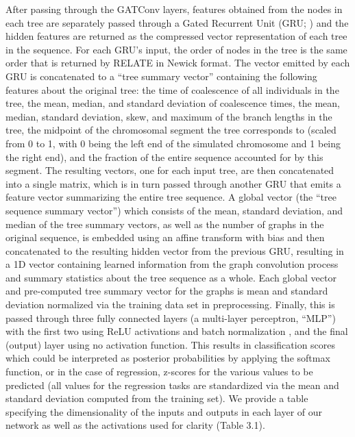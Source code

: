 After passing through the GATConv layers, features obtained from the nodes in each tree are separately passed through a Gated Recurrent Unit (GRU; \cite{choLearningPhraseRepresentations2014}) and the hidden features are returned as the compressed vector representation of each tree in the sequence. For each GRU's input, the order of nodes in the tree is the same order that is returned by RELATE in Newick format. The vector emitted by each GRU is concatenated to a “tree summary vector” containing the following features about the original tree: the time of coalescence of all individuals in the tree, the mean, median, and standard deviation of coalescence times, the mean, median, standard deviation, skew, and maximum of the branch lengths in the tree, the midpoint of the chromosomal segment the tree corresponds to (scaled from 0 to 1, with 0 being the left end of the simulated chromosome and 1 being the right end), and the fraction of the entire sequence accounted for by this segment. The resulting vectors, one for each input tree, are then concatenated into a single matrix, which is in turn passed through another GRU that emits a feature vector summarizing the entire tree sequence. A global vector (the “tree sequence summary vector”) which consists of the mean, standard deviation, and median of the tree summary vectors, as well as the number of graphs in the original sequence, is embedded using an affine transform with bias and then concatenated to the resulting hidden vector from the previous GRU, resulting in a 1D vector containing learned information from the graph convolution process and summary statistics about the tree sequence as a whole. Each global vector and pre-computed tree summary vector for the graphs is mean and standard deviation normalized via the training data set in preprocessing. Finally, this is passed through three fully connected layers (a multi-layer perceptron, “MLP”) with the first two using ReLU activations and batch normalization \cite{ioffeBatchNormalizationAccelerating2015}, and the final (output) layer using no activation function. This results in classification scores which could be interpreted as posterior probabilities by applying the softmax function, or in the case of regression, z-scores for the various values to be predicted (all values for the regression tasks are standardized via the mean and standard deviation computed from the training set). We provide a table specifying the dimensionality of the inputs and outputs in each layer of our network as well as the activations used for clarity (Table 3.1).

